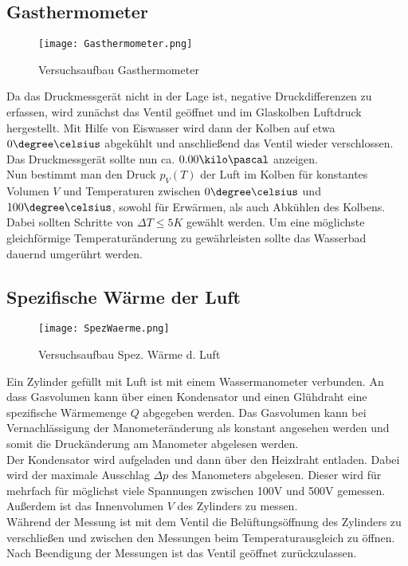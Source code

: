 \documentclass[12pt, a4paper, twoside]{scrartcl}
\begin{document}
\subsection{Gasthermometer}
\begin{figure}[h!]
	\centering
	\texttt{[image: Gasthermometer.png]}
	\caption{Versuchsaufbau Gasthermometer\protect\footnotemark} 
\end{figure}
Da das Druckmessgerät nicht in der Lage ist, negative  Druckdifferenzen zu erfassen, wird zunächst das Ventil geöffnet und im Glaskolben Luftdruck hergestellt. Mit Hilfe von Eiswasser wird dann der Kolben auf etwa $0\degree\celsius$ abgekühlt und anschließend das Ventil wieder verschlossen. Das Druckmessgerät sollte nun ca. $0.00\kilo\pascal$ anzeigen. \\
Nun bestimmt man den Druck $p_V \left( T \right)$ der Luft im Kolben für konstantes Volumen $V$ und Temperaturen zwischen $0\degree\celsius$ und $100\degree\celsius$, sowohl für Erwärmen, als auch Abkühlen des Kolbens. Dabei sollten Schritte von $\Delta T \le 5K $ gewählt werden. Um eine möglichste gleichförmige Temperaturänderung zu gewährleisten sollte das Wasserbad dauernd umgerührt werden.

\subsection{Spezifische Wärme der Luft}
\begin{figure}[h!]
	\centering
	\texttt{[image: SpezWaerme.png]}
	\caption{Versuchsaufbau Spez. Wärme d. Luft \protect\footnotemark}
\end{figure}
Ein Zylinder gefüllt mit Luft ist mit einem Wassermanometer verbunden. An dass Gasvolumen kann über einen Kondensator und einen Glühdraht eine spezifische Wärmemenge $Q$ abgegeben werden. Das Gasvolumen kann bei Vernachlässigung der Manometeränderung als konstant angesehen werden und somit die Druckänderung am Manometer abgelesen werden. \\
Der Kondensator wird aufgeladen und dann über den Heizdraht entladen. Dabei wird der maximale Ausschlag $\Delta p$ des Manometers abgelesen. Dieser wird für mehrfach für möglichst viele Spannungen zwischen 100V und 500V gemessen. Außerdem ist das Innenvolumen $V$ des Zylinders zu messen. \\
Während der Messung ist mit dem Ventil die Belüftungsöffnung des Zylinders zu verschließen und zwischen den Messungen beim Temperaturausgleich zu öffnen. Nach Beendigung der Messungen ist das Ventil geöffnet zurückzulassen.
\end{document}
